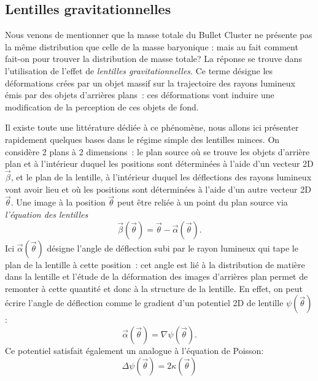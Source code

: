 \subsection{Lentilles gravitationnelles}
Nous venons de mentionner que la masse totale du Bullet Cluster ne présente pas la même distribution que celle de la masse baryonique : mais au fait comment fait-on pour trouver la distribution de masse totale? La réponse se trouve dans l'utilisation de l'effet de \textit{lentilles gravitationnelles}. Ce terme désigne les déformations crées par un objet massif sur la trajectoire des rayons lumineux émis par des objets d'arrières plans~: ces déformations vont induire une modification de la perception de ces objets de fond.

Il existe toute une littérature dédiée à ce phénomène, nous allons ici présenter rapidement quelques bases dans le régime simple des lentilles minces. On considère 2 plans à 2 dimensions~: le plan source où se trouve les objets d'arrière plan et à l'intérieur duquel les positions sont déterminées à l'aide d'un vecteur 2D $\vec{\beta}$, et le plan de la lentille, à l'intérieur duquel les déflections des rayons lumineux vont avoir lieu et où les positions sont déterminées à l'aide d'un autre vecteur 2D $\vec{\theta}$. Une image à la position $\vec{\theta}$ peut être reliée à un point du plan source via \textit{l'équation des lentilles}
\begin{equation}
\vec{\beta}(\vec{\theta})=\vec{\theta}-\vec{\alpha}(\vec{\theta}).
\end{equation}
Ici $\vec{\alpha}(\vec{\theta})$ désigne l'angle de déflection subi par le rayon lumineux qui tape le plan de la lentille à cette position~: cet angle est lié à la distribution de matière dans la lentille et l'étude de la déformation des images d'arrières plan permet de remonter à cette quantité et donc à la structure de la lentille. En effet, on peut écrire l'angle de déflection comme le gradient d'un potentiel 2D de lentille $\psi(\vec{\theta})$:
\begin{equation}
\vec{\alpha}(\vec{\theta})=\nabla \psi(\vec{\theta}).
\end{equation}
Ce potentiel satisfait également un analogue à l'équation de Poisson:
\begin{equation}
\Delta \psi(\vec{\theta}) = 2 \kappa (\vec{\theta})
\end{equation}
